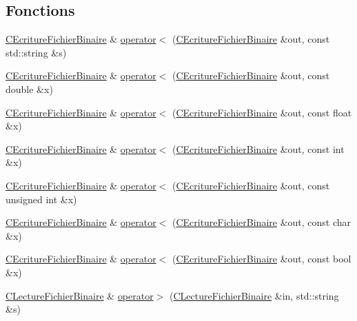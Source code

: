 \subsection*{Fonctions}
\begin{DoxyCompactItemize}
\item 
\hyperlink{class_c_ecriture_fichier_binaire}{C\-Ecriture\-Fichier\-Binaire} \& \hyperlink{group__utilitaire_ga3eb1e87955cdb70cd0b16f217740326b}{operator$<$} (\hyperlink{class_c_ecriture_fichier_binaire}{C\-Ecriture\-Fichier\-Binaire} \&out, const std\-::string \&s)
\item 
\hyperlink{class_c_ecriture_fichier_binaire}{C\-Ecriture\-Fichier\-Binaire} \& \hyperlink{group__utilitaire_ga04922202c65ecfea992b139fa3ad19ff}{operator$<$} (\hyperlink{class_c_ecriture_fichier_binaire}{C\-Ecriture\-Fichier\-Binaire} \&out, const double \&x)
\item 
\hyperlink{class_c_ecriture_fichier_binaire}{C\-Ecriture\-Fichier\-Binaire} \& \hyperlink{group__utilitaire_ga616de7f95d66959d1a2e3216143180aa}{operator$<$} (\hyperlink{class_c_ecriture_fichier_binaire}{C\-Ecriture\-Fichier\-Binaire} \&out, const float \&x)
\item 
\hyperlink{class_c_ecriture_fichier_binaire}{C\-Ecriture\-Fichier\-Binaire} \& \hyperlink{group__utilitaire_ga1c0af1c4869b15575ea9c9567a377776}{operator$<$} (\hyperlink{class_c_ecriture_fichier_binaire}{C\-Ecriture\-Fichier\-Binaire} \&out, const int \&x)
\item 
\hyperlink{class_c_ecriture_fichier_binaire}{C\-Ecriture\-Fichier\-Binaire} \& \hyperlink{group__utilitaire_gaa4c96e2902dbd2e7fc766683ae7dd3a0}{operator$<$} (\hyperlink{class_c_ecriture_fichier_binaire}{C\-Ecriture\-Fichier\-Binaire} \&out, const unsigned int \&x)
\item 
\hyperlink{class_c_ecriture_fichier_binaire}{C\-Ecriture\-Fichier\-Binaire} \& \hyperlink{group__utilitaire_ga2df50a83cca6bbfec35053d1b3f08a83}{operator$<$} (\hyperlink{class_c_ecriture_fichier_binaire}{C\-Ecriture\-Fichier\-Binaire} \&out, const char \&x)
\item 
\hyperlink{class_c_ecriture_fichier_binaire}{C\-Ecriture\-Fichier\-Binaire} \& \hyperlink{group__utilitaire_ga5e7baf907cb1eec95df25008219c34f7}{operator$<$} (\hyperlink{class_c_ecriture_fichier_binaire}{C\-Ecriture\-Fichier\-Binaire} \&out, const bool \&x)
\item 
\hyperlink{class_c_lecture_fichier_binaire}{C\-Lecture\-Fichier\-Binaire} \& \hyperlink{group__utilitaire_ga810bf15b405f05f3069b97084f61aa95}{operator$>$} (\hyperlink{class_c_lecture_fichier_binaire}{C\-Lecture\-Fichier\-Binaire} \&in, std\-::string \&s)

\end{DoxyCompactItemize}
